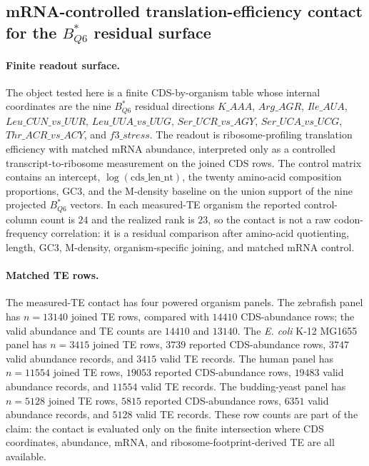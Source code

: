 \subsection{mRNA-controlled translation-efficiency contact for the $B^{*}_{Q6}$ residual surface}
\label{subsec:q6-mrna-controlled-translation-efficiency-survival-cross-layer}

\paragraph{Finite readout surface.}
The object tested here is a finite CDS-by-organism table whose internal coordinates are the nine $B^{*}_{Q6}$ residual directions
$K\_AAA$, $Arg\_AGR$, $Ile\_AUA$, $Leu\_CUN\_vs\_UUR$, $Leu\_UUA\_vs\_UUG$, $Ser\_UCR\_vs\_AGY$, $Ser\_UCA\_vs\_UCG$, $Thr\_ACR\_vs\_ACY$, and $f3\_stress$.
The readout is ribosome-profiling translation efficiency with matched mRNA abundance, interpreted only as a controlled transcript-to-ribosome measurement on the joined CDS rows.  The control matrix contains an intercept, $\log(\mathrm{cds\_len\_nt})$, the twenty amino-acid composition proportions, GC3, and the M-density baseline on the union support of the nine projected $B^{*}_{Q6}$ vectors.  In each measured-TE organism the reported control-column count is $24$ and the realized rank is $23$, so the contact is not a raw codon-frequency correlation: it is a residual comparison after amino-acid quotienting, length, GC3, M-density, organism-specific joining, and matched mRNA control.

\paragraph{Matched TE rows.}
The measured-TE contact has four powered organism panels.  The zebrafish panel has $n=13140$ joined TE rows, compared with $14410$ CDS-abundance rows; the valid abundance and TE counts are $14410$ and $13140$.  The \emph{E. coli} K-12 MG1655 panel has $n=3415$ joined TE rows, $3739$ reported CDS-abundance rows, $3747$ valid abundance records, and $3415$ valid TE records.  The human panel has $n=11554$ joined TE rows, $19053$ reported CDS-abundance rows, $19483$ valid abundance records, and $11554$ valid TE records.  The budding-yeast panel has $n=5128$ joined TE rows, $5815$ reported CDS-abundance rows, $6351$ valid abundance records, and $5128$ valid TE records.  These row counts are part of the claim: the contact is evaluated only on the finite intersection where CDS coordinates, abundance, mRNA, and ribosome-footprint-derived TE are all available.

